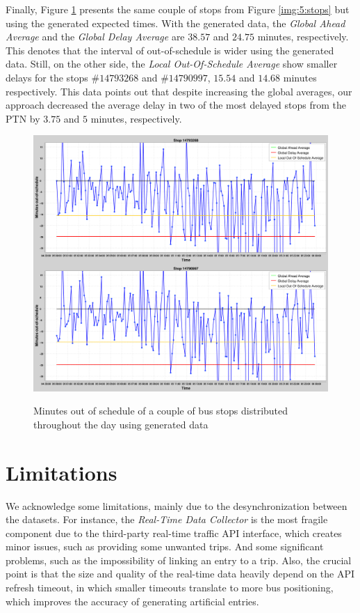 Finally, Figure \ref{img:5:stops_generated} presents the same couple of stops from Figure \ref{img:5:stops} but using the
generated expected times. With the generated data, the \textit{Global Ahead Average} and the \textit{Global Delay Average}
are $38.57$ and $24.75$ minutes, respectively. This denotes that the interval of out-of-schedule is wider using the generated data. Still, on the other side, the \textit{Local Out-Of-Schedule Average} show smaller delays for the stops $\#14793268$ and $\#14790997$, $15.54$ and $14.68$ minutes respectively. This data points out that despite increasing the global averages, our 
approach decreased the average delay in two of the most delayed stops from the PTN by $3.75$ and $5$ minutes, respectively.

\begin{figure}[h]
     \centering
        \caption{Minutes out of schedule of a couple of bus stops distributed throughout the day using generated data}
        \includegraphics[width=\textwidth]{imagem/cap5/stops2_generated.png}
        \label{img:5:stops_generated}
\end{figure}

\section{Limitations}
We acknowledge some limitations, mainly due to the desynchronization
between the datasets. For instance, the {\em Real-Time Data Collector} is the most fragile component due
to the third-party real-time traffic API interface, which creates minor issues,
such as providing some unwanted trips. And some significant problems, such as 
the impossibility of linking an entry to a trip. Also, the crucial point is that the size and quality of 
the real-time data heavily depend on the API refresh timeout, in which smaller
timeouts translate to more bus positioning, which improves the accuracy of generating
artificial entries.

